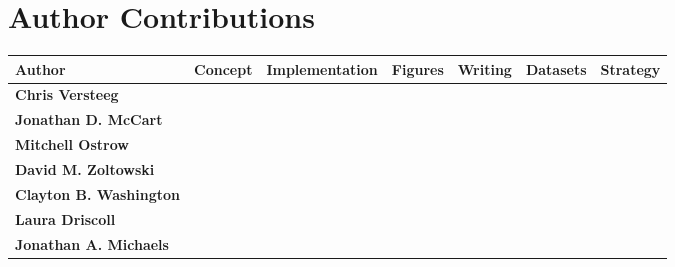 \documentclass{article}
\begin{document}
\section*{Author Contributions}
\begin{table}[ht]
\centering
\small
\renewcommand{\arraystretch}{1.2}
\begin{tabular}{lcccccc}
\toprule
\textbf{Author} &
\textbf{Concept} &
\textbf{Implementation} &
\textbf{Figures} &
\textbf{Writing} &
\textbf{Datasets} &
\textbf{Strategy} \\
\midrule
\textbf{Chris Versteeg}
& \cellcolor{gray!10} %
& \cellcolor{gray!10} %
& \cellcolor{gray!10} %
& \cellcolor{gray!10} %
&                  %
&                  %
\\
\textbf{Jonathan D. McCart}
& \cellcolor{gray!20} %
& \cellcolor{gray!20} %
&                   %
& \cellcolor{gray!20} %
&                   %
&                   %
\\
\textbf{Mitchell Ostrow}
&                   %
& \cellcolor{gray!20} %
& \cellcolor{gray!20} %
& \cellcolor{gray!20} %
&                   %
&                   %
\\
\textbf{David M. Zoltowski}
&                   %
& \cellcolor{gray!20} %
& \cellcolor{gray!20}%
& \cellcolor{gray!20} %
&                   %
&                   %
\\
\textbf{Clayton B. Washington}
&                   %
& \cellcolor{gray!20}%
&                   %
&                   %
&  %
&                   %
\\
\textbf{Laura Driscoll}
&                   %
& \cellcolor{gray!30} %
&                   %
& \cellcolor{gray!30} %
& \cellcolor{gray!30} %
& \cellcolor{gray!30} %
\\
\textbf{Jonathan A. Michaels}
&                   %
& \cellcolor{gray!30} %
&                   %
& \cellcolor{gray!30} %
& \cellcolor{gray!30} %
&                   %
\\

\end{tabular}
\end{table}
\end{document}
